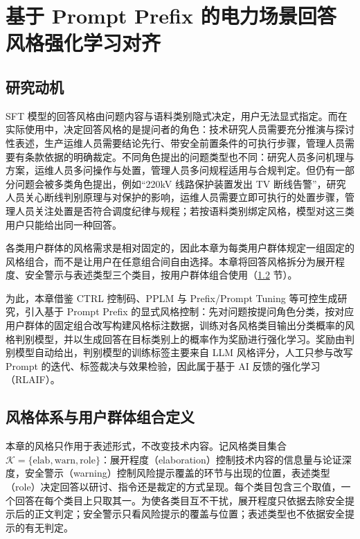 \documentclass[fontset=fandol,type=master,campus=shenzhen,etitleauto=true]{hithesisbook}
\begin{document}
\chapter{基于 Prompt Prefix 的电力场景回答风格强化学习对齐}\label{ux57faux4e8e-prompt-prefix-ux7684ux7535ux529bux573aux666fux56deux7b54ux98ceux683cux5f3aux5316ux5b66ux4e60ux5bf9ux9f50}

\section{研究动机}\label{ux7814ux7a76ux52a8ux673a-1}

SFT 模型的回答风格由问题内容与语料类别隐式决定，用户无法显式指定。而在实际使用中，决定回答风格的是提问者的角色：技术研究人员需要充分推演与探讨性表述，生产运维人员需要结论先行、带安全前置条件的可执行步骤，管理人员需要有条款依据的明确裁定。不同角色提出的问题类型也不同：研究人员多问机理与方案，运维人员多问操作与处置，管理人员多问规程适用与合规判定。但仍有一部分问题会被多类角色提出，例如“220kV 线路保护装置发出 TV 断线告警”，研究人员关心断线判别原理与对保护的影响，运维人员需要立即可执行的处置步骤，管理人员关注处置是否符合调度纪律与规程；若按语料类别绑定风格，模型对这三类用户只能给出同一种回答。

各类用户群体的风格需求是相对固定的，因此本章为每类用户群体规定一组固定的风格组合，而不是让用户在任意组合间自由选择。本章将回答风格拆分为展开程度、安全警示与表述类型三个类目，按用户群体组合使用（\ref{ux4e09ux7c7bux98ceux683c-prefix-ux5b9aux4e49} 节）。

为此，本章借鉴 CTRL 控制码、PPLM 与 Prefix/Prompt Tuning 等可控生成研究\cite{ref36,ref37,ref38,ref39}，引入基于 Prompt Prefix 的显式风格控制：先对问题按提问角色分类，按对应用户群体的固定组合改写构建风格标注数据，训练对各风格类目输出分类概率的风格判别模型，并以生成回答在目标类别上的概率作为奖励进行强化学习。奖励由判别模型自动给出，判别模型的训练标签主要来自 LLM 风格评分，人工只参与改写 Prompt 的迭代、标签裁决与效果检验，因此属于基于 AI 反馈的强化学习（RLAIF）\cite{ref44,ref90}。

\section{风格体系与用户群体组合定义}\label{ux4e09ux7c7bux98ceux683c-prefix-ux5b9aux4e49}

本章的风格只作用于表述形式，不改变技术内容。记风格类目集合 $\mathcal{K} = \{\text{elab}, \text{warn}, \text{role}\}$：展开程度（elaboration）控制技术内容的信息量与论证深度，安全警示（warning）控制风险提示覆盖的环节与出现的位置，表述类型（role）决定回答以研讨、指令还是裁定的方式呈现。每个类目包含三个取值，一个回答在每个类目上只取其一。为使各类目互不干扰，展开程度只依据去除安全提示后的正文判定；安全警示只看风险提示的覆盖与位置；表述类型也不依据安全提示的有无判定。
\end{document}
